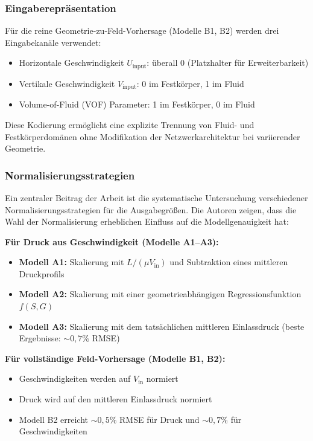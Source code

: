 \documentclass[a4paper,12pt]{article}
\begin{document}
\subsubsection*{Eingaberepräsentation}

Für die reine Geometrie-zu-Feld-Vorhersage (Modelle B1, B2) werden drei Eingabekanäle verwendet:
\begin{itemize}
    \item Horizontale Geschwindigkeit $U_{\text{input}}$: überall 0 (Platzhalter für Erweiterbarkeit)
    \item Vertikale Geschwindigkeit $V_{\text{input}}$: 0 im Festkörper, 1 im Fluid
    \item Volume-of-Fluid (VOF) Parameter: 1 im Festkörper, 0 im Fluid
\end{itemize}
Diese Kodierung ermöglicht eine explizite Trennung von Fluid- und Festkörperdomänen ohne Modifikation der Netzwerkarchitektur bei variierender Geometrie.

\subsubsection*{Normalisierungsstrategien}

Ein zentraler Beitrag der Arbeit ist die systematische Untersuchung verschiedener Normalisierungsstrategien für die Ausgabegrößen. Die Autoren zeigen, dass die Wahl der Normalisierung erheblichen Einfluss auf die Modellgenauigkeit hat:

\textbf{Für Druck aus Geschwindigkeit (Modelle A1--A3):}
\begin{itemize}
    \item \textbf{Modell A1:} Skalierung mit $L/(\mu V_{\text{in}})$ und Subtraktion eines mittleren Druckprofils
    \item \textbf{Modell A2:} Skalierung mit einer geometrieabhängigen Regressionsfunktion $f(S,G)$
    \item \textbf{Modell A3:} Skalierung mit dem tatsächlichen mittleren Einlassdruck (beste Ergebnisse: $\sim 0{,}7\%$ RMSE)
\end{itemize}

\textbf{Für vollständige Feld-Vorhersage (Modelle B1, B2):}
\begin{itemize}
    \item Geschwindigkeiten werden auf $V_{\text{in}}$ normiert
    \item Druck wird auf den mittleren Einlassdruck normiert
    \item Modell B2 erreicht $\sim 0{,}5\%$ RMSE für Druck und $\sim 0{,}7\%$ für Geschwindigkeiten
\end{itemize}
\end{document}
